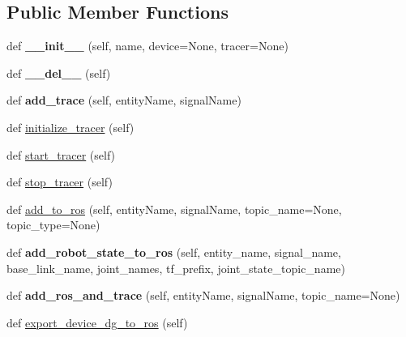 \subsection*{Public Member Functions}
\begin{DoxyCompactItemize}
\item 
def {\bfseries \+\_\+\+\_\+init\+\_\+\+\_\+} (self, name, device=None, tracer=None)\hypertarget{classrobot_1_1Robot_ad15eeb92007e66802fabd5ce42add7b0}{}\label{classrobot_1_1Robot_ad15eeb92007e66802fabd5ce42add7b0}

\item 
def {\bfseries \+\_\+\+\_\+del\+\_\+\+\_\+} (self)\hypertarget{classrobot_1_1Robot_a01b3eaee0bfc2251d32aceb7defb858b}{}\label{classrobot_1_1Robot_a01b3eaee0bfc2251d32aceb7defb858b}

\item 
def {\bfseries add\+\_\+trace} (self, entity\+Name, signal\+Name)\hypertarget{classrobot_1_1Robot_afe20b6b2c337dd9e0b4a53ed30c1a0cc}{}\label{classrobot_1_1Robot_afe20b6b2c337dd9e0b4a53ed30c1a0cc}

\item 
def \hyperlink{classrobot_1_1Robot_a1d39e4c3dd75c6c7592eeafe6596b773}{initialize\+\_\+tracer} (self)
\item 
def \hyperlink{classrobot_1_1Robot_a3efb51e990f1e3292f321858e9a9723f}{start\+\_\+tracer} (self)
\item 
def \hyperlink{classrobot_1_1Robot_ace42b97e31dcc38be3bd69b2ab33a214}{stop\+\_\+tracer} (self)
\item 
def \hyperlink{classrobot_1_1Robot_ac208f7eafdff6ad891e77402167e9ccc}{add\+\_\+to\+\_\+ros} (self, entity\+Name, signal\+Name, topic\+\_\+name=None, topic\+\_\+type=None)
\item 
def {\bfseries add\+\_\+robot\+\_\+state\+\_\+to\+\_\+ros} (self, entity\+\_\+name, signal\+\_\+name, base\+\_\+link\+\_\+name, joint\+\_\+names, tf\+\_\+prefix, joint\+\_\+state\+\_\+topic\+\_\+name)\hypertarget{classrobot_1_1Robot_a6c8b057c894e762bb43ceb7ec3e7db35}{}\label{classrobot_1_1Robot_a6c8b057c894e762bb43ceb7ec3e7db35}

\item 
def {\bfseries add\+\_\+ros\+\_\+and\+\_\+trace} (self, entity\+Name, signal\+Name, topic\+\_\+name=None)\hypertarget{classrobot_1_1Robot_a7b6df60b6a4d4e46777a49c55c14d26c}{}\label{classrobot_1_1Robot_a7b6df60b6a4d4e46777a49c55c14d26c}

\item 
def \hyperlink{classrobot_1_1Robot_ad5787c862823008387c047da5f34dd7e}{export\+\_\+device\+\_\+dg\+\_\+to\+\_\+ros} (self)
\end{DoxyCompactItemize}
